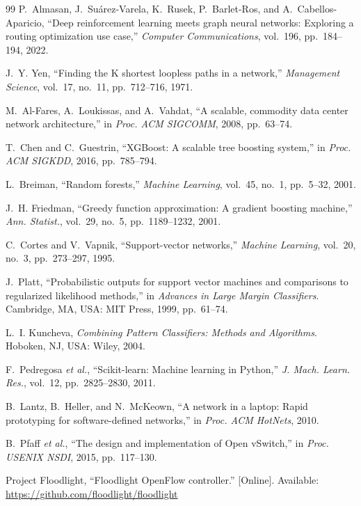 \documentclass[conference,a4paper]{IEEEtran}
\begin{document}
\begin{thebibliography}{99}
 P.~Almasan, J.~Su\'arez-Varela, K.~Rusek, P.~Barlet-Ros, and A.~Cabellos-Aparicio,
``Deep reinforcement learning meets graph neural networks: Exploring a routing optimization use case,''
\textit{Computer Communications}, vol.~196, pp.~184--194, 2022.

 J.~Y. Yen, ``Finding the K shortest loopless paths in a network,'' \textit{Management
Science}, vol.~17, no.~11, pp.~712--716, 1971.

 M.~Al-Fares, A.~Loukissas, and A.~Vahdat, ``A scalable, commodity data center network
architecture,'' in \textit{Proc. ACM SIGCOMM}, 2008, pp.~63--74.

 T.~Chen and C.~Guestrin, ``XGBoost: A scalable tree boosting system,'' in \textit{Proc.
ACM SIGKDD}, 2016, pp.~785--794.

 L.~Breiman, ``Random forests,'' \textit{Machine Learning}, vol.~45, no.~1, pp.~5--32, 2001.

 J.~H. Friedman, ``Greedy function approximation: A gradient boosting machine,''
\textit{Ann. Statist.}, vol.~29, no.~5, pp.~1189--1232, 2001.

 C.~Cortes and V.~Vapnik, ``Support-vector networks,'' \textit{Machine Learning}, vol.~20,
no.~3, pp.~273--297, 1995.

 J.~Platt, ``Probabilistic outputs for support vector machines and comparisons to
regularized likelihood methods,'' in \textit{Advances in Large Margin Classifiers}. Cambridge, MA, USA: MIT Press,
1999, pp.~61--74.

 L.~I. Kuncheva, \textit{Combining Pattern Classifiers: Methods and Algorithms}.
Hoboken, NJ, USA: Wiley, 2004.

 F.~Pedregosa \textit{et al.}, ``Scikit-learn: Machine learning in Python,''
\textit{J. Mach. Learn. Res.}, vol.~12, pp.~2825--2830, 2011.

 B.~Lantz, B.~Heller, and N.~McKeown, ``A network in a laptop: Rapid prototyping for
software-defined networks,'' in \textit{Proc. ACM HotNets}, 2010.

 B.~Pfaff \textit{et al.}, ``The design and implementation of Open vSwitch,'' in
\textit{Proc. USENIX NSDI}, 2015, pp.~117--130.

 Project Floodlight, ``Floodlight OpenFlow controller.'' [Online]. Available:
\url{https://github.com/floodlight/floodlight}


\end{thebibliography}
\end{document}
